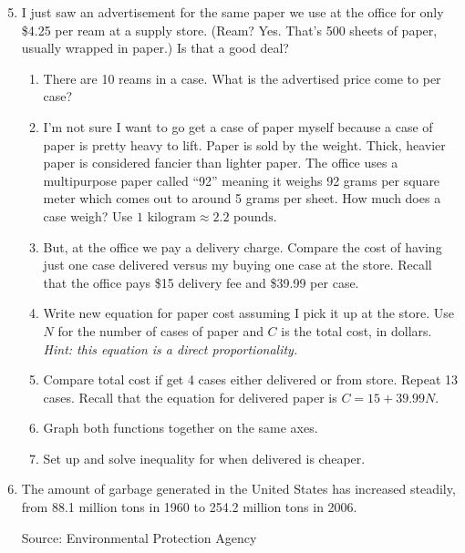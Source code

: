 \begin{enumerate} 
\setcounter{enumi}{4}

\item  I just saw an advertisement for the same paper we use at the office for only  \$4.25 per ream at a supply store.  (Ream?  Yes.  That's 500 sheets of paper, usually wrapped in paper.) Is that a good deal?
\begin{enumerate}
\item There are 10 reams in a case.  What is the advertised price come to per case?
\item I'm not sure I want to go get a case of paper myself because a case of paper is pretty heavy to lift.  Paper is sold by the weight.  Thick, heavier paper is considered fancier than lighter paper.  The office uses a multipurpose paper called ``92'' meaning it weighs 92 grams per square meter which comes out to around 5 grams per sheet.  How much does a case weigh? Use $1 \text{ kilogram} \approx 2.2 \text{ pounds}$. %
\item But, at the office we pay a delivery charge.  Compare the cost of having just one case delivered versus my buying one case at the store.  Recall that the office pays \$15 delivery fee and \$39.99 per case.
\item Write new equation for paper cost assuming I pick it up at the store. Use $N$ for the number of cases of paper and $C$ is the total cost, in dollars.
 \emph{Hint: this equation is a direct proportionality.}
\item Compare total cost if get 4 cases either delivered or from store.  Repeat 13 cases.  Recall that the equation for delivered paper is $C=15+39.99N$.
\item Graph both functions together on the same axes.
\item Set up and solve inequality for when delivered is cheaper.  
\end{enumerate}

\item The amount of garbage generated in the United States has increased steadily, from 88.1 million tons in 1960 to 254.2 million tons in 2006.  

\hfill \begin{footnotesize}  Source:  Environmental Protection Agency \end{footnotesize}


\end{enumerate}
